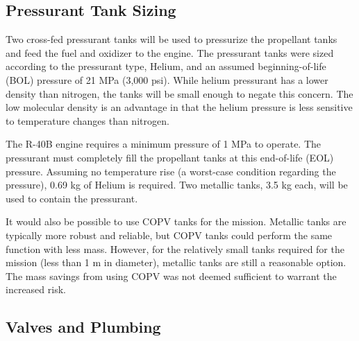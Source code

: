 \documentclass[paper=letter, fontsize=11pt]{scrartcl} %
\numberwithin{equation}{section} %
\numberwithin{figure}{section} %
\numberwithin{table}{section} %
\begin{document}
\subsection{Pressurant Tank Sizing}

Two cross-fed pressurant tanks will be used to pressurize the propellant tanks and feed the fuel and oxidizer to the engine. The pressurant tanks were sized according to the pressurant type, Helium, and an assumed beginning-of-life (BOL) pressure of 21 MPa (3,000 psi). While helium pressurant has a lower density than nitrogen, the tanks will be small enough to negate this concern. The low molecular density is an advantage in that the helium pressure is less sensitive to temperature changes than nitrogen.

The R-40B engine requires a minimum pressure of 1 MPa to operate. The pressurant must completely fill the propellant tanks at this end-of-life (EOL) pressure. Assuming no temperature rise (a worst-case condition regarding the pressure), 0.69 kg of Helium is required. Two metallic tanks, 3.5 kg each, will be used to contain the pressurant.

It would also be possible to use COPV tanks for the mission. Metallic tanks are typically more robust and reliable, but COPV tanks could perform the same function with less mass. However, for the relatively small tanks required for the mission (less than 1 m in diameter), metallic tanks are still a reasonable option. The mass savings from using COPV was not deemed sufficient to warrant the increased risk.

\subsection{Valves and Plumbing}
\end{document}

